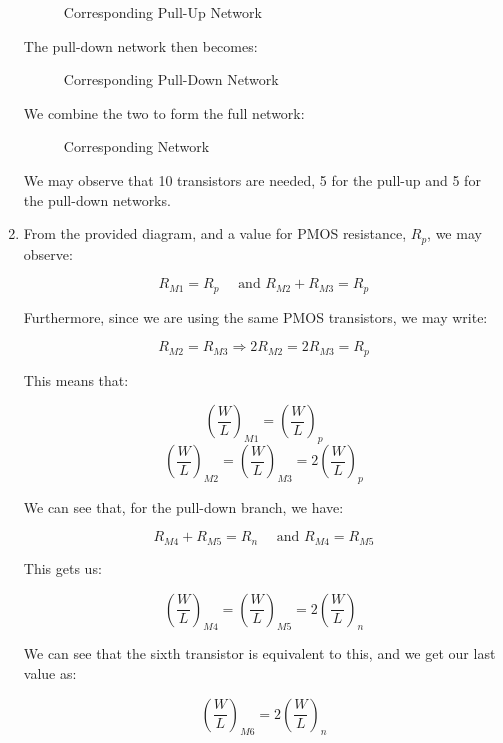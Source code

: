 \begin{enumerate}
    \begin{figure}[H]
      \centering
      
      \caption{Corresponding Pull-Up Network}
      \label{fig:5}
    \end{figure}

    The pull-down network then becomes:

    \begin{figure}[H]
      \centering
      
      \caption{Corresponding Pull-Down Network}
      \label{fig:6}
    \end{figure}

    We combine the two to form the full network:

    \begin{figure}[H]
      \centering
      
      \caption{Corresponding Network}
      \label{fig:7}
    \end{figure}

    We may observe that 10 transistors are needed, 5 for the pull-up and 5 for the pull-down networks.

  \item From the provided diagram, and a value for PMOS resistance, $R_p$, we may observe:

    $$R_{M1}=R_p\quad\text{ and }R_{M2}+R_{M3}=R_p$$

    Furthermore, since we are using the same PMOS transistors, we may write:

    $$R_{M2}=R_{M3}\Longrightarrow 2R_{M2}=2R_{M3}=R_p$$

    This means that:

    $$\boxed{\left( \frac{W}{L} \right)_{M1}=\left( \frac{W}{L} \right)_{p}}$$
    $$\boxed{\left( \frac{W}{L} \right)_{M2}=\left( \frac{W}{L} \right)_{M3}=2\left( \frac{W}{L} \right)_{p}}$$

    We can see that, for the pull-down branch, we have:

    $$R_{M4}+R_{M5}=R_n\quad\text{ and }R_{M4}=R_{M5}$$

    This gets us:

    $$\boxed{\left( \frac{W}{L} \right)_{M4}=\left( \frac{W}{L} \right)_{M5}=2\left( \frac{W}{L} \right)_{n}}$$

    We can see that the sixth transistor is equivalent to this, and we get our last value as:

    $$\boxed{\left( \frac{W}{L} \right)_{M6}=2\left( \frac{W}{L} \right)_{n}}$$

\end{enumerate}



